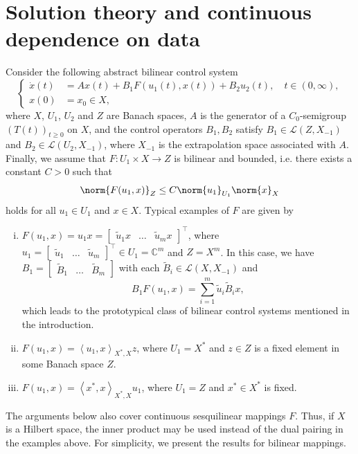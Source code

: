 \documentclass{cocv}
\newcommand{\inprod}[2]{\left\langle#1,#2\right\rangle}
\newcommand{\CC}{\mathbb C}
\theoremstyle{definition}
\begin{document}
\section{Solution theory and continuous dependence on data}
\label{sec:well-posedness}

Consider the following abstract bilinear control system
\begin{equation}\label{eq:bilinear}
    \tag{$\Sigma$} \left\{
        \begin{aligned}
            \dot x(t) &= Ax(t) + B_1F(u_1(t),x(t)) + B_2u_2(t), \quad t\in (0, \infty),\\
            x(0) &= x_0 \in X,
        \end{aligned} \right.
    \end{equation}
 where $X$, $U_1$, $U_2$ and $Z$ are Banach spaces, $A$ is the generator of a $C_0$-semigroup $(T(t))_{t\geq 0}$ on $X$, and the control operators $B_1, B_2$ satisfy $B_1 \in \mathcal{L}(Z,X_{-1})$ and $B_2 \in \mathcal L(U_2, X_{-1})$, where $X_{-1}$ is the extrapolation space associated with $A$. Finally, we assume that $F \colon U_1 \times X \to Z$ is bilinear and bounded, i.e. there exists a constant $C>0$ such that
 \begin{equation}\label{eq:F_bdd}
    \norm{F(u_1,x)}_Z \leq C \norm{u_1}_{U_1} \norm{x}_X
 \end{equation}
 holds for all $u_1 \in U_1$ and $x \in X$. 
 Typical examples of $F$ are given by
 \begin{enumerate}[(i)]
     \item $F(u_1,x) = u_1x = \begin{bmatrix} \tilde{u}_1 x & \dots & \tilde{u}_m x\end{bmatrix}^\top$, where $u_1= \begin{bmatrix} \tilde{u}_1 & \dots & \tilde{u}_m \end{bmatrix}^\top \in U_1=\CC^m$ and $Z=X^m$. In this case, we have $B_1= \begin{bmatrix} \tilde B_1 & \dots & \tilde B_m \end{bmatrix}$ with each $\tilde B_i \in \mathcal{L}(X,X_{-1})$ and
     \begin{equation}\label{eq:example_bilinear_sum}
         B_1F(u_1,x) = \sum_{i=1}^m \tilde{u}_i \tilde{B}_i x,
     \end{equation}
     which leads to the prototypical class of bilinear control systems mentioned in the introduction.
     \item $F(u_1,x) = \inprod{u_1}{x}_{X^*,X} z$, where $U_1=X^*$ and $z \in Z$ is a fixed element in some Banach space $Z$.

     \item $F(u_1,x) = \inprod{x^*}{x}_{X^*,X} u_1$, where $U_1=Z$ and $x^* \in X^*$ is fixed.
 \end{enumerate}
The arguments below also cover continuous sesquilinear mappings $F$.
Thus, if $X$ is a Hilbert space, the inner product may be used instead of the
dual pairing in the examples above. For simplicity, we present the results for
bilinear mappings.
\end{document}
